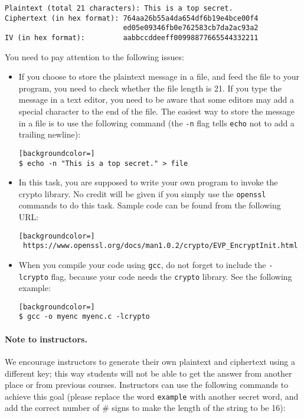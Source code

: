 \begin{lstlisting}
Plaintext (total 21 characters): This is a top secret.
Ciphertext (in hex format): 764aa26b55a4da654df6b19e4bce00f4  
                            ed05e09346fb0e762583cb7da2ac93a2 
IV (in hex format):         aabbccddeeff00998877665544332211
\end{lstlisting}



You need to pay attention to the following issues: 

\begin{itemize} 
\item If you choose to store the plaintext message in 
a file, and feed the file to your program, you need to check
whether the file length is 21. If you type the message in a text editor,
you need to be aware that some editors may add a special
character to the end of the file. The easiest way to store the message
in a file is to use the following 
command (the \texttt{-n} flag
tells \texttt{echo} not to  add a trailing newline):


\begin{lstlisting}[backgroundcolor=]
$ echo -n "This is a top secret." > file
\end{lstlisting}
 
\item In this task, you are supposed to write your own program 
to invoke the crypto library. No credit will be given 
if you simply use the {\tt openssl} commands to do this task. 
Sample code can be found from the following URL:
\begin{lstlisting}[backgroundcolor=]
 https://www.openssl.org/docs/man1.0.2/crypto/EVP_EncryptInit.html
\end{lstlisting}


\item When you compile your code using  \texttt{gcc},
do not forget to include the \texttt{-lcrypto} flag, because your code 
needs the \texttt{crypto} library. See the following example: 

\begin{lstlisting}[backgroundcolor=]
$ gcc -o myenc myenc.c -lcrypto 
\end{lstlisting}

\end{itemize} 

\paragraph{Note to instructors.} 
We encourage instructors to generate their own plaintext and ciphertext using 
a different key; this way students will not be able to get the answer from
another place or from previous courses. Instructors can use the
following commands to achieve this goal (please replace the word \texttt{example}
with another secret word, and add the correct number of \# signs to make
the length of the string to be 16):

